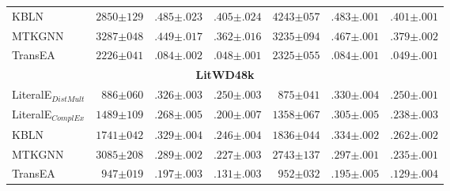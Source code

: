 \begin{table}[]
\begin{center}
\begin{tabular}{l|rll|rll}
KBLN& $2850{\scriptstyle \pm 129}$ & $.485{\scriptstyle \pm .023}$ & $.405{\scriptstyle \pm .024}$ & $4243{\scriptstyle \pm 057}$ & $.483{\scriptstyle \pm .001}$ & $.401{\scriptstyle \pm .001}$  \\ 
MTKGNN& $3287{\scriptstyle \pm 048}$ & $.449{\scriptstyle \pm .017}$ & $.362{\scriptstyle \pm .016}$ & $3235{\scriptstyle \pm 094}$ & $.467{\scriptstyle \pm .001}$ & $.379{\scriptstyle \pm .002}$  \\ 
TransEA& $2226{\scriptstyle \pm 041}$ & $.084{\scriptstyle \pm .002}$ & $.048{\scriptstyle \pm .001}$ & $2325{\scriptstyle \pm 055}$ & $.084{\scriptstyle \pm .001}$ & $.049{\scriptstyle \pm .001}$  \\ 
\hline \multicolumn{7}{c}{\textbf{LitWD48k}} \\ \hline 
LiteralE$_{DistMult}$& $886{\scriptstyle \pm 060}$ & $.326{\scriptstyle \pm .003}$ & $.250{\scriptstyle \pm .003}$ & $875{\scriptstyle \pm 041}$ & $.330{\scriptstyle \pm .004}$ & $.250{\scriptstyle \pm .001}$  \\ 
LiteralE$_{ComplEx}$& $1489{\scriptstyle \pm 109}$ & $.268{\scriptstyle \pm .005}$ & $.200{\scriptstyle \pm .007}$ & $1358{\scriptstyle \pm 067}$ & $.305{\scriptstyle \pm .005}$ & $.238{\scriptstyle \pm .003}$  \\ 
KBLN& $1741{\scriptstyle \pm 042}$ & $.329{\scriptstyle \pm .004}$ & $.246{\scriptstyle \pm .004}$ & $1836{\scriptstyle \pm 044}$ & $.334{\scriptstyle \pm .002}$ & $.262{\scriptstyle \pm .002}$  \\ 
MTKGNN& $3085{\scriptstyle \pm 208}$ & $.289{\scriptstyle \pm .002}$ & $.227{\scriptstyle \pm .003}$ & $2743{\scriptstyle \pm 137}$ & $.297{\scriptstyle \pm .001}$ & $.235{\scriptstyle \pm .001}$  \\ 
TransEA& $947{\scriptstyle \pm 019}$ & $.197{\scriptstyle \pm .003}$ & $.131{\scriptstyle \pm .003}$ & $952{\scriptstyle \pm 032}$ & $.195{\scriptstyle \pm .005}$ & $.129{\scriptstyle \pm .004}$  \\ 

\hline
\end{tabular}
\end{center}
\end{table}
